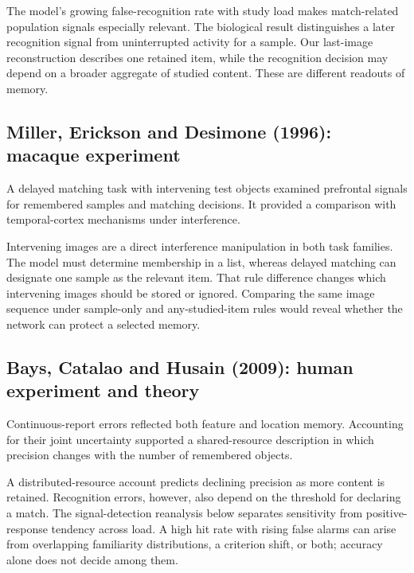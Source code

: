 \documentclass[11pt]{article}
\begin{document}
The model’s growing false-recognition rate with study load makes match-related population signals especially relevant. The biological result distinguishes a later recognition signal from uninterrupted activity for a sample. Our last-image reconstruction describes one retained item, while the recognition decision may depend on a broader aggregate of studied content. These are different readouts of memory.

\subsection{Miller, Erickson and Desimone (1996): macaque experiment}
A delayed matching task with intervening test objects examined prefrontal signals for remembered samples and matching decisions. It provided a comparison with temporal-cortex mechanisms under interference. \cite{bio_miller96}

Intervening images are a direct interference manipulation in both task families. The model must determine membership in a list, whereas delayed matching can designate one sample as the relevant item. That rule difference changes which intervening images should be stored or ignored. Comparing the same image sequence under sample-only and any-studied-item rules would reveal whether the network can protect a selected memory.

\subsection{Bays, Catalao and Husain (2009): human experiment and theory}
Continuous-report errors reflected both feature and location memory. Accounting for their joint uncertainty supported a shared-resource description in which precision changes with the number of remembered objects. \cite{bio_bays}

A distributed-resource account predicts declining precision as more content is retained. Recognition errors, however, also depend on the threshold for declaring a match. The signal-detection reanalysis below separates sensitivity from positive-response tendency across load. A high hit rate with rising false alarms can arise from overlapping familiarity distributions, a criterion shift, or both; accuracy alone does not decide among them.
\end{document}
